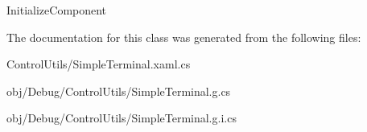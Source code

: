 Initialize\+Component 



The documentation for this class was generated from the following files\+:\begin{DoxyCompactItemize}
\item 
Control\+Utils/Simple\+Terminal.\+xaml.\+cs\item 
obj/\+Debug/\+Control\+Utils/Simple\+Terminal.\+g.\+cs\item 
obj/\+Debug/\+Control\+Utils/Simple\+Terminal.\+g.\+i.\+cs\end{DoxyCompactItemize}
